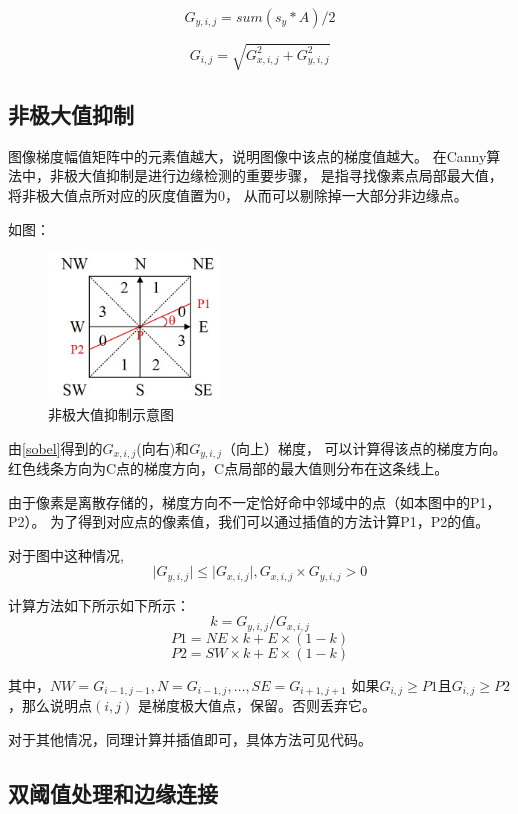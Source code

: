 \documentclass{article}
\begin{document}
\[G_{y, i,j} = sum\left( s_y * A \right) / 2
\]

\[G_{i,j} = \sqrt{G_{x, i,j}^2 + G_{y, i,j}^2}
\]

\subsection{非极大值抑制}

    图像梯度幅值矩阵中的元素值越大，说明图像中该点的梯度值越大。
    在Canny算法中，非极大值抑制是进行边缘检测的重要步骤，
    是指寻找像素点局部最大值，将非极大值点所对应的灰度值置为0，
    从而可以剔除掉一大部分非边缘点。

    如图：
\begin{figure}[h]
    \centering
    \includegraphics[width=0.4\textwidth]{./report/img}
    \caption{非极大值抑制示意图}
\end{figure}

    由\ref{sobel}得到的\(G_{x, i,j}\)(向右)和\(G_{y, i,j}\)（向上）梯度，
    可以计算得该点的梯度方向。
    红色线条方向为C点的梯度方向，C点局部的最大值则分布在这条线上。

    由于像素是离散存储的，梯度方向不一定恰好命中邻域中的点（如本图中的P1，P2）。
    为了得到对应点的像素值，我们可以通过插值的方法计算P1，P2的值。

    对于图中这种情况,
    \[\lvert G_{y, i,j} \rvert \leq \lvert G_{x, i,j}\rvert, G_{x, i,j}\times G_{y, i,j} > 0\]

    计算方法如下所示如下所示：
\[
    k = G_{y, i,j} / G_{x, i,j}
\]
\[
    P1 = NE \times k + E \times (1 - k)
\]
\[
    P2 = SW \times k + E \times (1 - k)
\]

    其中，\(NW = G_{i - 1, j - 1}, N = G_{i - 1, j}, \ldots, SE = G_{i + 1, j + 1}\)
    如果\(G_{i, j} \geq P1\)且\(G_{i, j} \geq P2\)，那么说明点\(\left( i, j \right)\)
    是梯度极大值点，保留。否则丢弃它。

    对于其他情况，同理计算并插值即可，具体方法可见代码。

\subsection{双阈值处理和边缘连接}
\end{document}
